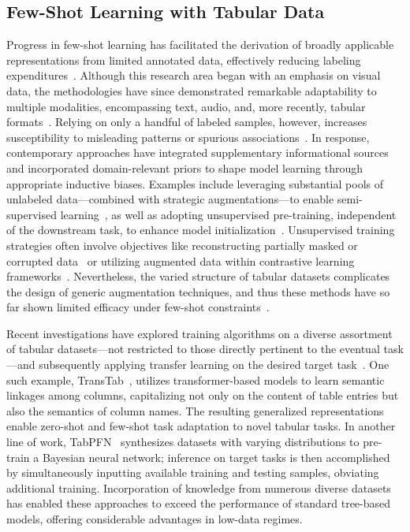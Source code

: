 \subsection{Few-Shot Learning with Tabular Data} Progress in few-shot learning has facilitated the derivation of broadly applicable representations from limited annotated data, effectively reducing labeling expenditures~\cite{chen2018closer}. Although this research area began with an emphasis on visual data, the methodologies have since demonstrated remarkable adaptability to multiple modalities, encompassing text, audio, and, more recently, tabular formats~\cite{majumder2022few,nam2023stunt,schick2021exploiting}. Relying on only a handful of labeled samples, however, increases susceptibility to misleading patterns or spurious associations~\cite{bartlett2021deep}. In response, contemporary approaches have integrated supplementary informational sources and incorporated domain-relevant priors to shape model learning through appropriate inductive biases. Examples include leveraging substantial pools of unlabeled data—combined with strategic augmentations—to enable semi-supervised learning~\cite{ucar2021subtab,yoon2020vime}, as well as adopting unsupervised pre-training, independent of the downstream task, to enhance model initialization~\cite{somepalli2021saint}. Unsupervised training strategies often involve objectives like reconstructing partially masked or corrupted data~\cite{arik2021tabnet,majmundar2022met} or utilizing augmented data within contrastive learning frameworks~\cite{bahri2022scarf,chen2020simple}. Nevertheless, the varied structure of tabular datasets complicates the design of generic augmentation techniques, and thus these methods have so far shown limited efficacy under few-shot constraints~\cite{nam2023stunt}.

Recent investigations have explored training algorithms on a diverse assortment of tabular datasets—not restricted to those directly pertinent to the eventual task—and subsequently applying transfer learning on the desired target task~\cite{zhang2023generative,levin2022transfer,zhu2023xtab}. One such example, TransTab~\cite{wang2022transtab}, utilizes transformer-based models to learn semantic linkages among columns, capitalizing not only on the content of table entries but also the semantics of column names. The resulting generalized representations enable zero-shot and few-shot task adaptation to novel tabular tasks. In another line of work, TabPFN~\cite{hollmann2022tabpfn} synthesizes datasets with varying distributions to pre-train a Bayesian neural network; inference on target tasks is then accomplished by simultaneously inputting available training and testing samples, obviating additional training. Incorporation of knowledge from numerous diverse datasets has enabled these approaches to exceed the performance of standard tree-based models, offering considerable advantages in low-data regimes.

